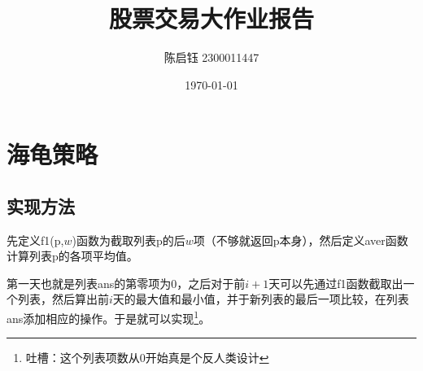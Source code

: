 \documentclass{ctexart}
\title{股票交易大作业报告}
\author{陈启钰\,\,2300011447}
\date{\today}
\begin{document}
	\maketitle
	\newpage
	\section{海龟策略}
	\subsection{实现方法}
	先定义f1(p,$w$)函数为截取列表p的后$w$项（不够就返回p本身），然后定义aver函数计算列表p的各项平均值。
	
	第一天也就是列表ans的第零项为0，之后对于前$i+1$天可以先通过f1函数截取出一个列表，然后算出前$i$天的最大值和最小值，并于新列表的最后一项比较，在列表ans添加相应的操作。于是就可以实现\footnote{吐槽：这个列表项数从0开始真是个反人类设计}。
\end{document}
